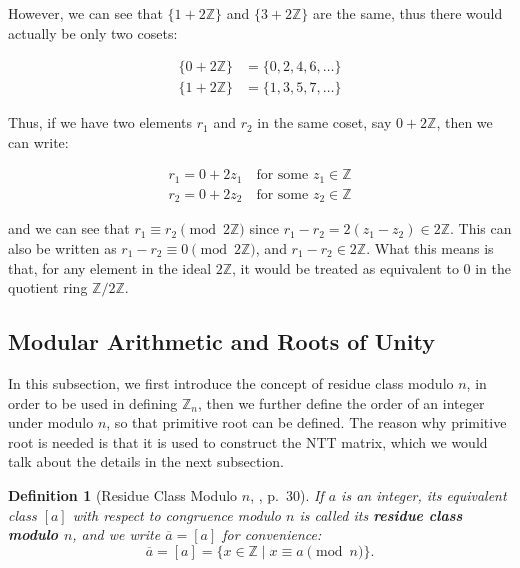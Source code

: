 \documentclass[12pt]{article}
\newtheorem{definition}{Definition}[section]
\begin{document}
However, we can see that $\{1 + 2\mathbb{Z}\}$ and $\{3 + 2\mathbb{Z}\}$ are the same, 
thus there would actually be only two cosets:

\begin{align*}
    \{0 + 2\mathbb{Z}\} &= \{0, 2, 4, 6, \ldots\} \\
    \{1 + 2\mathbb{Z}\} &= \{1, 3, 5, 7, \ldots\} 
\end{align*}

Thus, if we have two elements $r_1$ and $r_2$ in the same coset, say $0 + 2\mathbb{Z}$, 
then we can write:

\begin{align*}
    r_1 = 0 + 2 z_1 \quad \text{for some } z_1 \in \mathbb{Z} \\
    r_2 = 0 + 2 z_2 \quad \text{for some } z_2 \in \mathbb{Z}
\end{align*}

and we can see that $r_1 \equiv r_2 \pmod{2\mathbb{Z}}$ since $r_1 - r_2 = 2(z_1 - z_2) \in 2\mathbb{Z}$.
This can also be written as $r_1 - r_2 \equiv 0 \pmod{2\mathbb{Z}}$, and $r_1 - r_2 \in 2\mathbb{Z}$. 
What this means is that, for any element in the ideal $2\mathbb{Z}$, 
it would be treated as equivalent to $0$ in the quotient ring $\mathbb{Z}/2\mathbb{Z}$.

\subsection{Modular Arithmetic and Roots of Unity}

In this subsection, we first introduce the concept of residue class modulo $n$, 
in order to be used in defining $\mathbb{Z}_n$, 
then we further define the order of an integer under modulo $n$, 
so that primitive root can be defined. 
The reason why primitive root is needed is that it is used to construct the NTT matrix, 
which we would talk about the details in the next subsection.

\begin{definition}[Residue Class Modulo $n$, \cite{algebra}, p.~30]
    If $a$ is an integer, its equivalent class $[a]$ with respect to congruence modulo $n$ is called its \textbf{residue class modulo $n$}, 
    and we write $\overline{a} = [a]$ for convenience: 
    \begin{equation*}
    \overline{a} = [a] = \{x \in \mathbb{Z} \mid x \equiv a \pmod{n}\}.
    \end{equation*}
\end{definition}
\end{document}
